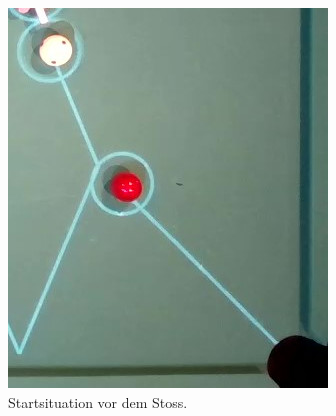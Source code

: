 \begin{figure}[h!]
    \centering
    \begin{subfigure}[t]{0.2\textwidth}
        \centering
        \includegraphics[width=1.0\linewidth]{../common/04_results/resources/simulation_vs_reality/video_12_0205_0208_situation_cut.jpg}
        \caption{Startsituation vor dem Stoss.}
        \label{fig:video_12_0205_0208_situation}
    \end{subfigure}
    \hfill
    \begin{subfigure}[t]{0.2\textwidth}
        \centering

\end{subfigure}
\end{figure}
